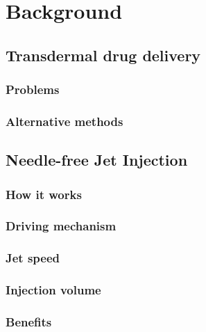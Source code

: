 \chapter{Background}                                \label{Chapter:background}


\section{Transdermal drug delivery}                 \label{Chapter:background/transdermal drug delivery}
    \subsection{Problems}                           \label{Chapter:background/transdermal drug delivery/problems}
    \subsection{Alternative methods}                \label{Chapter:background/transdermal drug delivery/alternative methods}


\section{Needle-free Jet Injection}                 \label{Chapter:background/needle-free jet injection}
    \subsection{How it works}                       \label{Chapter:background/needle-free jet injection/how it works}
    \subsection{Driving mechanism}                  \label{Chapter:background/needle-free jet injection/driving mechanism}
    \subsection{Jet speed}                          \label{Chapter:background/needle-free jet injection/jet speed}
    \subsection{Injection volume}                   \label{Chapter:background/needle-free jet injection/injection volume}
    \subsection{Benefits}                           \label{Chapter:background/needle-free jet injection/benefits}
